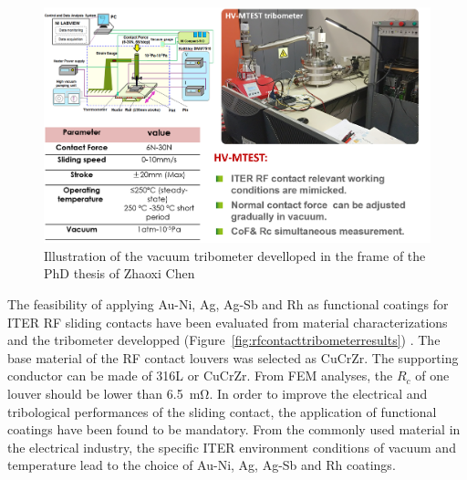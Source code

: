 {\begin{figure}[h]
	\centering
	\includegraphics[width=1.0\linewidth]{figures/chap3/RF_contacts/RF_contact_tribometer_zhaoxi}
	\caption{Illustration of the vacuum tribometer develloped in the frame of the PhD thesis of Zhaoxi Chen\cite{chen2018}}
	\label{fig:rfcontacttribometerzhaoxi}
\end{figure}

The feasibility of applying Au-Ni, Ag, Ag-Sb and Rh as functional coatings for ITER RF sliding contacts have been evaluated from material characterizations and the tribometer developped (Figure~\ref{fig:rfcontacttribometerresults}) . The base material of the RF contact louvers was selected as CuCrZr. The supporting conductor can be made of 316L or CuCrZr. From FEM analyses, the $R_c$ of one louver should be lower than 6.5~$\si{\milli\ohm}$. In order to improve the electrical and tribological performances of the sliding contact, the application of functional coatings have been found to be mandatory. From the commonly used material in the electrical industry, the specific ITER environment conditions of vacuum and temperature lead to the choice of Au-Ni, Ag, Ag-Sb and Rh coatings. 

}
